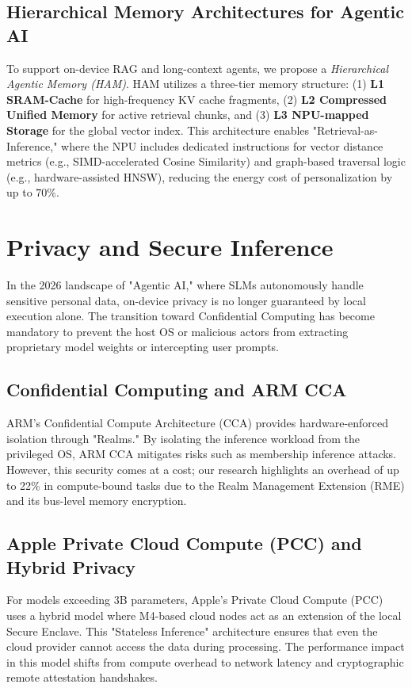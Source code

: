 \documentclass[twocolumn,10pt]{article}
\begin{document}
\subsection{Hierarchical Memory Architectures for Agentic AI}
\label{subsec:ham}
To support on-device RAG and long-context agents, we propose a \textit{Hierarchical Agentic Memory (HAM)}. HAM utilizes a three-tier memory structure: (1) \textbf{L1 SRAM-Cache} for high-frequency KV cache fragments, (2) \textbf{L2 Compressed Unified Memory} for active retrieval chunks, and (3) \textbf{L3 NPU-mapped Storage} for the global vector index. This architecture enables "Retrieval-as-Inference," where the NPU includes dedicated instructions for vector distance metrics (e.g., SIMD-accelerated Cosine Similarity) and graph-based traversal logic (e.g., hardware-assisted HNSW), reducing the energy cost of personalization by up to $70\%$.

\section{Privacy and Secure Inference}
In the 2026 landscape of "Agentic AI," where SLMs autonomously handle sensitive personal data, on-device privacy is no longer guaranteed by local execution alone. The transition toward Confidential Computing has become mandatory to prevent the host OS or malicious actors from extracting proprietary model weights or intercepting user prompts.

\subsection{Confidential Computing and ARM CCA} \label{subsec:cca}
ARM's Confidential Compute Architecture (CCA) \cite{arm_cca_2024} provides hardware-enforced isolation through "Realms." By isolating the inference workload from the privileged OS, ARM CCA mitigates risks such as membership inference attacks. However, this security comes at a cost; our research highlights an overhead of up to 22\% in compute-bound tasks due to the Realm Management Extension (RME) and its bus-level memory encryption.


\subsection{Apple Private Cloud Compute (PCC) and Hybrid Privacy}
For models exceeding 3B parameters, Apple's Private Cloud Compute (PCC) \cite{apple_pcc_2024} uses a hybrid model where M4-based cloud nodes act as an extension of the local Secure Enclave. This "Stateless Inference" architecture ensures that even the cloud provider cannot access the data during processing. The performance impact in this model shifts from compute overhead to network latency and cryptographic remote attestation handshakes.
\end{document}
